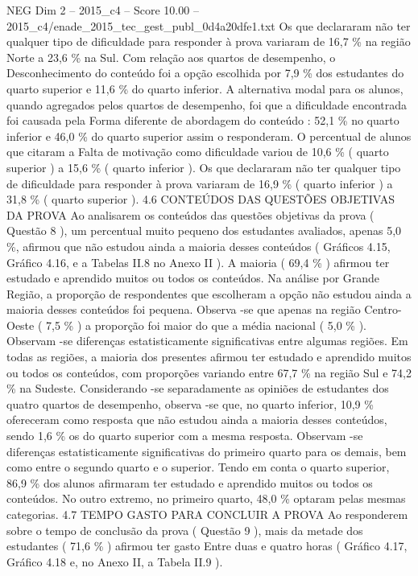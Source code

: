 \begin{textsample}{NEG Dim 2 – 2015\_c4 – Score 10.00 – 2015\_c4/enade\_2015\_tec\_gest\_publ\_0d4a20dfe1.txt}
Os que declararam não ter qualquer tipo de dificuldade para responder à prova variaram de 16,7 \% na região Norte a 23,6 \% na Sul.
Com relação aos quartos de desempenho, o Desconhecimento do conteúdo foi a opção escolhida por 7,9 \% dos estudantes do quarto superior e 11,6 \% do quarto inferior.
A alternativa modal para os alunos, quando agregados pelos quartos de desempenho, foi que a dificuldade encontrada foi causada pela Forma diferente de abordagem do conteúdo : 52,1 \% no quarto inferior e 46,0 \% do quarto superior assim o responderam.
O percentual de alunos que citaram a Falta de motivação como dificuldade variou de 10,6 \% ( quarto superior ) a 15,6 \% ( quarto inferior ).
Os que declararam não ter qualquer tipo de dificuldade para responder à prova variaram de 16,9 \% ( quarto inferior ) a 31,8 \% ( quarto superior ). 4.6 CONTEÚDOS DAS QUESTÕES OBJETIVAS DA PROVA Ao analisarem os conteúdos das questões objetivas da prova ( Questão 8 ), um percentual muito pequeno dos estudantes avaliados, apenas 5,0 \%, afirmou que não estudou ainda a maioria desses conteúdos ( Gráficos 4.15, Gráfico 4.16, e a Tabelas II.8 no Anexo II ).
A maioria ( 69,4 \% ) afirmou ter estudado e aprendido muitos ou todos os conteúdos.
Na análise por Grande Região, a proporção de respondentes que escolheram a opção não estudou ainda a maioria desses conteúdos foi pequena.
Observa -se que apenas na região Centro-Oeste ( 7,5 \% ) a proporção foi maior do que a média nacional ( 5,0 \% ).
Observam -se diferenças estatisticamente significativas entre algumas regiões.
Em todas as regiões, a maioria dos presentes afirmou ter estudado e aprendido muitos ou todos os conteúdos, com proporções variando entre 67,7 \% na região Sul e 74,2 \% na Sudeste.
Considerando -se separadamente as opiniões de estudantes dos quatro quartos de desempenho, observa -se que, no quarto inferior, 10,9 \% ofereceram como resposta que não estudou ainda a maioria desses conteúdos, sendo 1,6 \% os do quarto superior com a mesma resposta.
Observam -se diferenças estatisticamente significativas do primeiro quarto para os demais, bem como entre o segundo quarto e o superior.
Tendo em conta o quarto superior, 86,9 \% dos alunos afirmaram ter estudado e aprendido muitos ou todos os conteúdos.
No outro extremo, no primeiro quarto, 48,0 \% optaram pelas mesmas categorias. 4.7 TEMPO GASTO PARA CONCLUIR A PROVA Ao responderem sobre o tempo de conclusão da prova ( Questão 9 ), mais da metade dos estudantes ( 71,6 \% ) afirmou ter gasto Entre duas e quatro horas ( Gráfico 4.17, Gráfico 4.18 e, no Anexo II, a Tabela II.9 ).

\end{textsample}
